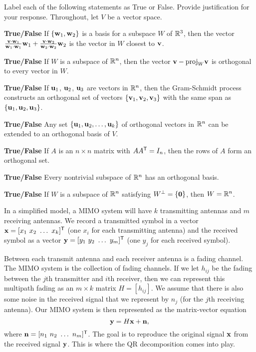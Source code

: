 \ea


\item Label each of the following statements as True or False. Provide justification for your response. Throughout, let $V$ be a vector space. 
	\ba
	\item \textbf{True/False} If $\{\mathbf{w}_1, \mathbf{w}_2\}$ is a basis for a subspace $W$ of $\mathbb{R}^3$, then the vector $\frac{\mathbf{v} \cdot \mathbf{w}_1}{\mathbf{w}_1 \cdot \mathbf{w}_1} \mathbf{w}_1 + \frac{\mathbf{v} \cdot \mathbf{w}_2}{\mathbf{w}_2 \cdot \mathbf{w}_2}  \mathbf{w}_2$ is the vector in $W$ closest to $\mathbf{v}$. 
	\item \textbf{True/False}  If $W$ is a subspace of $\mathbb{R}^n$, then the vector $\mathbf{v} - \text{proj}_{W} \mathbf{v}$ is orthogonal to every vector in $W$.
	\item \textbf{True/False} If $\mathbf{u}_1$, $\mathbf{u}_2$, $\mathbf{u}_3$ are vectors in $\mathbb{R}^n$, then the Gram-Schmidt process constructs an orthogonal set of vectors $\{\mathbf{v}_1, \mathbf{v}_2, \mathbf{v}_3\}$ with the same span as $\{\mathbf{u}_1, \mathbf{u}_2, \mathbf{u}_3\}$. 
	\item \textbf{True/False} Any set $\{\mathbf{u}_1, \mathbf{u}_2, \ldots, \mathbf{u}_k\}$ of orthogonal vectors in $\mathbb{R}^n$ can be extended to an orthogonal basis of $V$. 
	\item \textbf{True/False} If $A$ is an $n \times n$ matrix with $AA^{\mathsf{T}} = I_n$, then the rows of $A$ form an orthogonal set. 
	\item \textbf{True/False} Every nontrivial subspace of $\mathbb{R}^n$ has an orthogonal basis. 
	\item \textbf{True/False} If $W$ is a subspace of $\mathbb{R}^n$ satisfying $W^\perp=\{\mathbf{0}\}$, then $W=\mathbb{R}^n$. 
	 \ea

\ee


In a simplified model, a MIMO system will have $k$ transmitting antennas and $m$ receiving antennas. We record a transmitted symbol in a vector $\mathbf{x} = [x_1 \ x_2 \ \ldots \ x_k]^{\mathsf{T}}$ (one $x_i$ for each transmitting antenna) and the received symbol as a vector $\mathbf{y} = [y_1 \ y_2 \ \ldots \ y_m]^{\mathsf{T}}$ (one $y_j$ for each received symbol). 

Between each transmit antenna and each receiver antenna is a fading channel. The MIMO system is the collection of fading channels. If we let $h_{ij}$ be the fading between the $j$th transmitter and $i$th receiver, then we can represent this multipath fading as an $m \times k$ matrix $H = [h_{ij}]$. We assume that there is also some noise in the received signal that we represent by $n_j$ (for the $j$th receiving antenna). Our MIMO system is then represented as the matrix-vector equation
\[\mathbf{y} = H\mathbf{x} + \mathbf{n},\]
where $\mathbf{n} = [n_1 \ n_2 \ \ldots \ n_m]^{\mathsf{T}}$. The goal is to reproduce the original signal $\mathbf{x}$ from the received signal $\mathbf{y}$. This is where the QR decomposition comes into play. 


